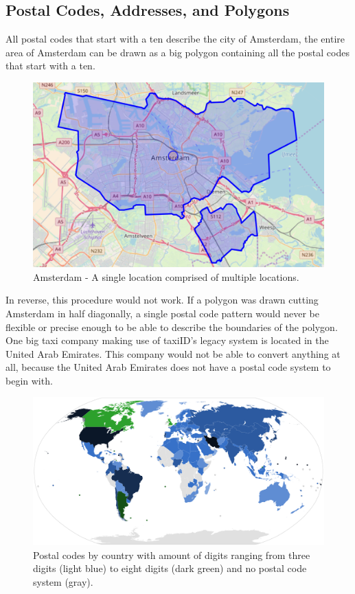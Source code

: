 \subsection{Postal Codes, Addresses, and Polygons}
All postal codes that start with a ten describe the city of Amsterdam, the entire area of Amsterdam can be drawn as a big polygon containing all the postal codes that start with a ten.

\begin{figure}[H]
	\centering
	\includegraphics[width=.8\textwidth]{Amsterdam}
	\caption[Amsterdam]{Amsterdam - A single location comprised of multiple locations.}
	\label{fig:Amsterdam}
\end{figure}

In reverse, this procedure would not work. If a polygon was drawn cutting Amsterdam in half diagonally, a single postal code pattern would never be flexible or precise enough to be able to describe the boundaries of the polygon. One big taxi company making use of taxiID's legacy system is located in the United Arab Emirates. This company would not be able to convert anything at all, because the United Arab Emirates does not have a postal code system to begin with.

\begin{figure}[H]
	\centering
	\includegraphics[width=.8\textwidth]{PostalCodes}
	\caption[PostalCodes]{Postal codes by country with amount of digits ranging from three digits (light blue) to eight digits (dark green) and no postal code system (gray).}
	\label{fig:postalcodes}
\end{figure}

